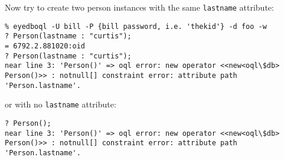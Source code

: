 \normalsize
\ee
Now try to create two person instances with the same \texttt{lastname} attribute:
\verbsize \begin{verbatim}
% eyedboql -U bill -P {bill password, i.e. 'thekid'} -d foo -w
? Person(lastname : "curtis");
= 6792.2.881020:oid
? Person(lastname : "curtis");
near line 3: 'Person()' => oql error: new operator <<new<oql\$db> Person()>> : notnull[] constraint error: attribute path 'Person.lastname'.
\end{verbatim}
\normalsize
or with no \texttt{lastname} attribute:
\verbsize \begin{verbatim}
? Person();
near line 3: 'Person()' => oql error: new operator <<new<oql\$db> Person()>> : notnull[] constraint error: attribute path 'Person.lastname'.
\end{verbatim}
\normalsize

